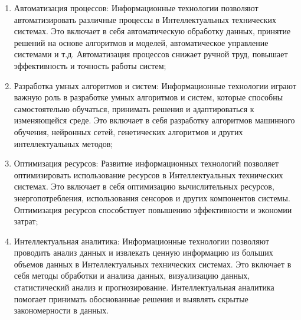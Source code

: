 \begin{enumerate}
        \item Автоматизация процессов: Информационные технологии позволяют автоматизировать различные процессы в Интеллектуальных технических системах. Это включает в себя автоматическую обработку данных, принятие решений на основе алгоритмов и моделей, автоматическое управление системами и т.д. Автоматизация процессов снижает ручной труд, повышает эффективность и точность работы систем;
        \item Разработка умных алгоритмов и систем: Информационные технологии играют важную роль в разработке умных алгоритмов и систем, которые способны самостоятельно обучаться, принимать решения и адаптироваться к изменяющейся среде. Это включает в себя разработку алгоритмов машинного обучения, нейронных сетей, генетических алгоритмов и других интеллектуальных методов;
        \item Оптимизация ресурсов: Развитие информационных технологий позволяет оптимизировать использование ресурсов в Интеллектуальных технических системах. Это включает в себя оптимизацию вычислительных ресурсов, энергопотребления, использования сенсоров и других компонентов системы. Оптимизация ресурсов способствует повышению эффективности и экономии затрат;
        \item Интеллектуальная аналитика: Информационные технологии позволяют проводить анализ данных и извлекать ценную информацию из больших объемов данных в Интеллектуальных технических системах. Это включает в себя методы обработки и анализа данных, визуализацию данных, статистический анализ и прогнозирование. Интеллектуальная аналитика помогает принимать обоснованные решения и выявлять скрытые закономерности в данных.
    \end{enumerate}

